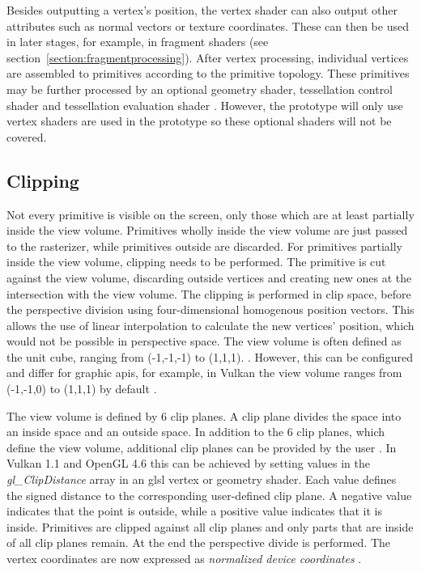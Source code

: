 Besides outputting a vertex's position, the vertex shader can also output other attributes such as normal vectors or texture coordinates. These can then be used in later stages, for example, in fragment shaders (see section~\ref{section:fragmentprocessing}). After vertex processing, individual vertices are assembled to primitives according to the primitive topology. These primitives may be further processed by an optional geometry shader, tessellation control shader and tessellation evaluation shader \cite{akine:2018:realtime, khronos:vulkan:spec1.1}. However, the prototype will only use vertex shaders are used in the prototype so these optional shaders will not be covered.


\subsection{Clipping}
\label{section:clipping}

Not every primitive is visible on the screen, only those which are at least partially inside the view volume. Primitives wholly inside the view volume are just passed to the rasterizer, while primitives outside are discarded. For primitives partially inside the view volume, clipping needs to be performed. The primitive is cut against the view volume, discarding outside vertices and creating new ones at the intersection with the view volume. The clipping is performed in clip space, before the perspective division using four-dimensional homogenous position vectors. This allows the use of linear interpolation to calculate the new vertices' position, which would not be possible in perspective space. The view volume is often defined as the unit cube, ranging from (-1,-1,-1) to (1,1,1).
\cite{akine:2018:realtime}. However, this can be configured and differ for graphic \glspl{api}, for example, in Vulkan the view volume ranges from (-1,-1,0) to (1,1,1) by default \cite{khronos:glsl4.60:spec}.

The view volume is defined by 6 clip planes. A clip plane divides the space into an inside space and an outside space.
In addition to the 6 clip planes, which define the view volume, additional clip planes can be provided by the user \cite{akine:2018:realtime}. In Vulkan 1.1 and OpenGL 4.6 this can be achieved by setting values in the \textit{gl\_ClipDistance} array in an \gls{glsl} vertex or geometry shader. Each value defines the signed distance to the corresponding user-defined clip plane. A negative value indicates that the point is outside, while a positive value indicates that it is inside. Primitives are clipped against all clip planes and only parts that are inside of all clip planes remain. At the end the perspective divide is performed. The vertex coordinates are now expressed as \textit{normalized device coordinates} \cite{khronos:vulkan:spec1.1, khronos:openGL:spec4.6}.

